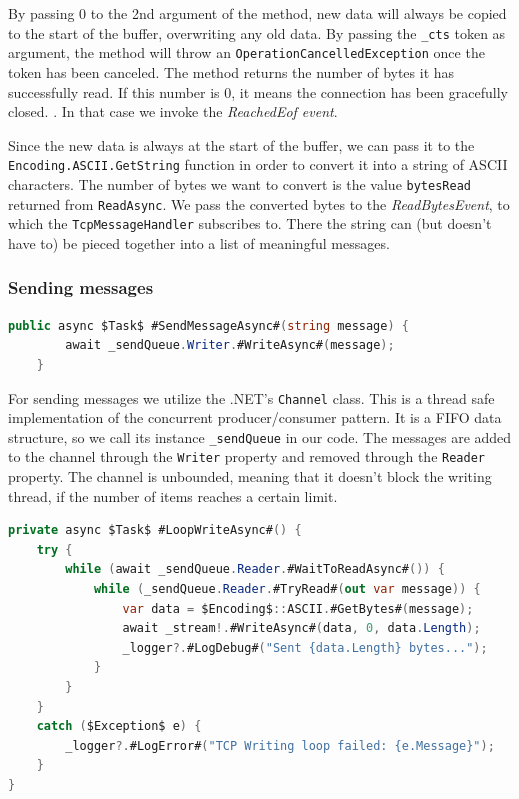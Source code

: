 By passing 0 to the 2nd argument of the method, new data will always be copied to the start of the buffer, overwriting any old data. By passing the \texttt{\_cts} token as argument, the method will throw an \texttt{OperationCancelledException} once the token has been canceled. The method returns the number of bytes it has successfully read. If this number is 0, it means the connection has been gracefully closed. \cite{msdocs_network_stream}. In that case we invoke the \textit{ReachedEof event}.

Since the new data is always at the start of the buffer, we can pass it to the \texttt{Encoding.ASCII.GetString} function in order to convert it into a string of ASCII characters. The number of bytes we want to convert is the value \texttt{bytesRead} returned from \texttt{ReadAsync}. We pass the converted bytes to the \textit{ReadBytesEvent}, to which the \texttt{TcpMessageHandler} subscribes to. There the string can (but doesn't have to) be pieced together into a list of meaningful messages.

\subsubsection{Sending messages}

\begin{lstlisting}[language=csharp, caption={\texttt{TcpClient.SendMessageAsync} method}]
    public async $Task$ #SendMessageAsync#(string message) {
        await _sendQueue.Writer.#WriteAsync#(message);
    }
\end{lstlisting}

For sending messages we utilize the .NET's \texttt{Channel} class. This is a thread safe implementation of the concurrent producer/consumer pattern. It is a FIFO data structure, so we call its instance \texttt{\_sendQueue} in our code. The messages are added to the channel through the \texttt{Writer} property and removed through the \texttt{Reader} property. The channel is unbounded, meaning that it doesn't block the writing thread, if the number of items reaches a certain limit. 

\begin{lstlisting}[language=csharp, caption={\texttt{TcpClient.LoopWriteAsync} method}]
private async $Task$ #LoopWriteAsync#() {
    try {
        while (await _sendQueue.Reader.#WaitToReadAsync#()) {
            while (_sendQueue.Reader.#TryRead#(out var message)) {
                var data = $Encoding$::ASCII.#GetBytes#(message);
                await _stream!.#WriteAsync#(data, 0, data.Length);
                _logger?.#LogDebug#("Sent {data.Length} bytes...");
            }
        }
    }
    catch ($Exception$ e) {
        _logger?.#LogError#("TCP Writing loop failed: {e.Message}");
    }
}
\end{lstlisting}


